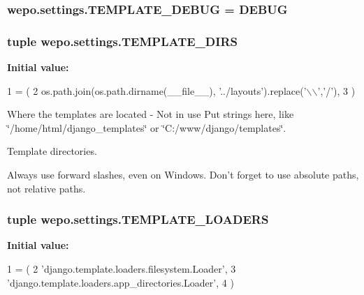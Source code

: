 \hypertarget{namespacewepo_1_1settings_a0f6674bef75273821f06faa219b29eeb}{
\subsubsection[{T\-E\-M\-P\-L\-A\-T\-E\-\_\-\-D\-E\-B\-U\-G}]{\setlength{\rightskip}{0pt plus 5cm}wepo.\-settings.\-T\-E\-M\-P\-L\-A\-T\-E\-\_\-\-D\-E\-B\-U\-G = {\bf D\-E\-B\-U\-G}}}\label{namespacewepo_1_1settings_a0f6674bef75273821f06faa219b29eeb}
\hypertarget{namespacewepo_1_1settings_a4cd3f2ad4c57d4a726db437cccd99a71}{
\subsubsection[{T\-E\-M\-P\-L\-A\-T\-E\-\_\-\-D\-I\-R\-S}]{\setlength{\rightskip}{0pt plus 5cm}tuple wepo.\-settings.\-T\-E\-M\-P\-L\-A\-T\-E\-\_\-\-D\-I\-R\-S}}\label{namespacewepo_1_1settings_a4cd3f2ad4c57d4a726db437cccd99a71}
{\bfseries Initial value\-:}
\begin{DoxyCode}
1 = (
2    os.path.join(os.path.dirname(\_\_file\_\_), \textcolor{stringliteral}{'../layouts'}).replace(\textcolor{stringliteral}{'\(\backslash\)\(\backslash\)'},\textcolor{stringliteral}{'/'}),
3 )
\end{DoxyCode}


Where the templates are located -\/ Not in use Put strings here, like \char`\"{}/home/html/django\-\_\-templates\char`\"{} or \char`\"{}\-C\-:/www/django/templates\char`\"{}. 

Template directories.

Always use forward slashes, even on Windows. Don't forget to use absolute paths, not relative paths. \hypertarget{namespacewepo_1_1settings_a9077964357f8bc248cd25fd1565c681d}{
\subsubsection[{T\-E\-M\-P\-L\-A\-T\-E\-\_\-\-L\-O\-A\-D\-E\-R\-S}]{\setlength{\rightskip}{0pt plus 5cm}tuple wepo.\-settings.\-T\-E\-M\-P\-L\-A\-T\-E\-\_\-\-L\-O\-A\-D\-E\-R\-S}}\label{namespacewepo_1_1settings_a9077964357f8bc248cd25fd1565c681d}
{\bfseries Initial value\-:}
\begin{DoxyCode}
1 = (
2    \textcolor{stringliteral}{'django.template.loaders.filesystem.Loader'},
3    \textcolor{stringliteral}{'django.template.loaders.app\_directories.Loader'},
4 )
\end{DoxyCode}


